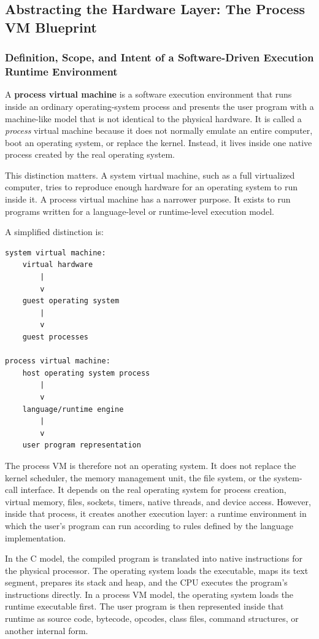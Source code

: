 \documentclass[a4paper,twoside]{report}
\begin{document}
\subsection{Abstracting the Hardware Layer: The Process VM Blueprint}



\subsubsection{Definition, Scope, and Intent of a Software-Driven Execution Runtime Environment}

A \textbf{process virtual machine} is a software execution environment that runs inside an ordinary operating-system process and presents the user program with a machine-like model that is not identical to the physical hardware. It is called a \emph{process} virtual machine because it does not normally emulate an entire computer, boot an operating system, or replace the kernel. Instead, it lives inside one native process created by the real operating system.

This distinction matters. A system virtual machine, such as a full virtualized computer, tries to reproduce enough hardware for an operating system to run inside it. A process virtual machine has a narrower purpose. It exists to run programs written for a language-level or runtime-level execution model.

A simplified distinction is:

\begin{verbatim}
system virtual machine:
    virtual hardware
        |
        v
    guest operating system
        |
        v
    guest processes

process virtual machine:
    host operating system process
        |
        v
    language/runtime engine
        |
        v
    user program representation
\end{verbatim}

The process VM is therefore not an operating system. It does not replace the kernel scheduler, the memory management unit, the file system, or the system-call interface. It depends on the real operating system for process creation, virtual memory, files, sockets, timers, native threads, and device access. However, inside that process, it creates another execution layer: a runtime environment in which the user's program can run according to rules defined by the language implementation.

In the C model, the compiled program is translated into native instructions for the physical processor. The operating system loads the executable, maps its text segment, prepares its stack and heap, and the CPU executes the program's instructions directly. In a process VM model, the operating system loads the runtime executable first. The user program is then represented inside that runtime as source code, bytecode, opcodes, class files, command structures, or another internal form.
\end{document}
